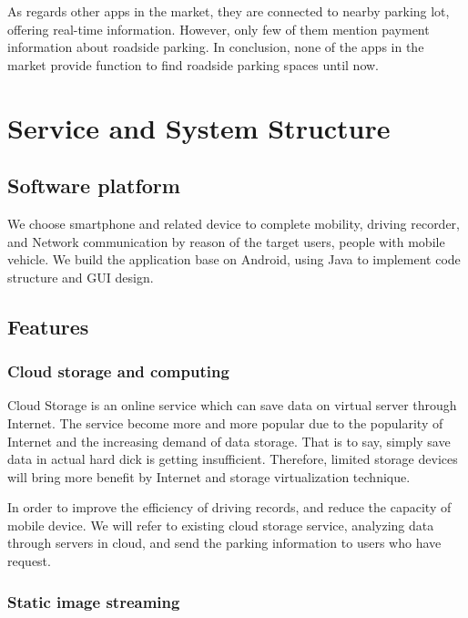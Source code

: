 \documentclass[preprint,12pt]{elsarticle}
\begin{document}
As regards other apps in the market, they are connected to nearby
parking lot, offering real-time information. However, only few of
them mention payment information about roadside parking. In conclusion,
none of the apps in the market provide function to find roadside parking
spaces until now.

\section{Service and System Structure}\label{sec:service}

%
\subsection{Software platform}
%

We choose smartphone and related device to complete mobility, driving
recorder, and Network communication by reason of the target users,
people with mobile vehicle. We build the application base on Android,
using Java to implement code structure and GUI design.

%
\subsection{Features}
%

%
\subsubsection{Cloud storage and computing}
%

Cloud Storage is an online service which can save data on virtual server
through Internet. The service become more and more popular due to the
popularity of Internet and the increasing demand of data storage. That
is to say, simply save data in actual hard dick is getting insufficient.
Therefore, limited storage devices will bring more benefit by Internet
and storage virtualization technique.

In order to improve the efficiency of driving records, and reduce the
capacity of mobile device. We will refer to existing cloud storage
service, analyzing data through servers in cloud, and send the parking
information to users who have request.

%
\subsubsection{Static image streaming}
%
\end{document}
